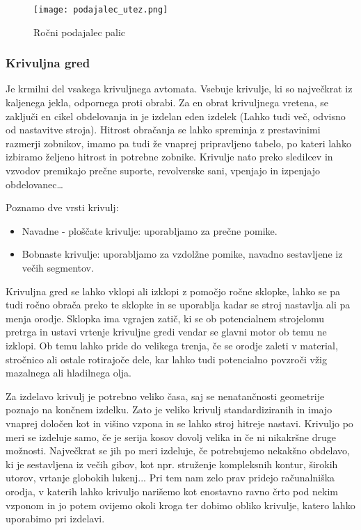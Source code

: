 \begin{figure}[H]
	\begin{center}
		\texttt{[image: podajalec\_utez.png]}
		\caption{Ročni podajalec palic
			\cite{interna}}
		\label{shema_rocnega_podajalca}
	\end{center}
\end{figure}

\subsubsection{Krivuljna gred}
Je krmilni del vsakega krivuljnega avtomata. Vsebuje krivulje,
ki so največkrat iz kaljenega jekla, odpornega proti obrabi. Za en
obrat krivuljnega vretena, se zaključi en cikel obdelovanja in je
izdelan eden izdelek (Lahko tudi več, odvisno od nastavitve stroja).
Hitrost obračanja se lahko spreminja z prestavinimi razmerji
zobnikov, imamo pa tudi že vnaprej pripravljeno tabelo, po kateri
lahko izbiramo željeno hitrost in potrebne zobnike. Krivulje nato
preko sledilcev in vzvodov premikajo prečne suporte,
revolverske sani, vpenjajo in izpenjajo obdelovanec…

\noindent Poznamo dve vrsti krivulj:
\begin{itemize}
	\item Navadne - ploščate krivulje: uporabljamo za prečne pomike.
	\item Bobnaste krivulje: uporabljamo za vzdolžne pomike, navadno
	      sestavljene iz večih segmentov.
\end{itemize}

Krivuljna gred se lahko vklopi ali izklopi z pomočjo ročne sklopke,
lahko se pa tudi ročno obrača preko te sklopke in se uporablja kadar
se stroj nastavlja ali pa menja orodje. Sklopka ima vgrajen
zatič, ki se ob potencialnem strojelomu pretrga in ustavi vrtenje
krivuljne gredi vendar se glavni motor ob temu ne izklopi.
Ob temu lahko pride do velikega trenja, če se orodje zaleti v
material, stročnico ali ostale rotirajoče dele, kar lahko tudi
potencialno povzroči vžig mazalnega ali hladilnega olja.

Za izdelavo krivulj je potrebno veliko časa, saj
se nenatančnosti geometrije poznajo na končnem izdelku. Zato je
veliko krivulj standardiziranih in imajo vnaprej določen kot in
višino vzpona in se lahko stroj hitreje nastavi. Krivuljo po
meri se izdeluje samo, če je serija kosov dovolj velika in če ni
nikakršne druge možnosti. Največkrat se jih po meri izdeluje,
če potrebujemo nekakšno obdelavo, ki je sestavljena iz večih gibov,
kot npr. struženje kompleksnih kontur, širokih utorov, vrtanje
globokih lukenj... Pri tem nam zelo prav pridejo računalniška
orodja, v katerih lahko krivuljo narišemo kot enostavno ravno
črto pod nekim vzponom in jo potem ovijemo okoli kroga ter dobimo
obliko krivulje, katero lahko uporabimo pri izdelavi.

